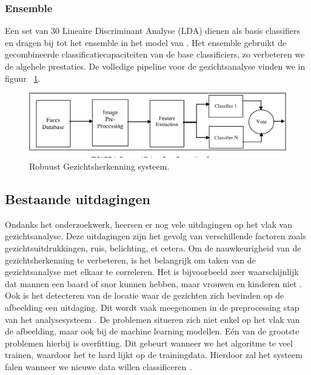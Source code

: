 \subsubsection{Ensemble}
\label{subsub:ensemble}
Een set van 30 Lineaire Discriminant Analyse (LDA) dienen als basis classifiers en dragen bij tot het ensemble in het model van \textcite{Khan2017}. Het ensemble gebruikt de gecombineerde classificatiecapaciteiten van de base classificiers, zo verbeteren we de algehele prestaties. De volledige pipeline voor de gezichtsanalyse vinden we in figuur {~\ref{fig:ensemble}}. 
\begin{figure}
    \centering
    \includegraphics[width=\columnwidth]{graphics/ensemble.png}
    \caption{\label{fig:ensemble}Robuust Gezichtsherkenning systeem\autocite{Khan2017}.}
\end{figure}

\subsection{Bestaande uitdagingen}
Ondanks het onderzoekwerk, heersen er nog vele uitdagingen op het vlak van gezichtsanalyse. Deze uitdagingen zijn het gevolg van verschillende factoren zoals gezichtsuitdrukkingen, ruis, belichting, et cetera. Om de nauwkeurigheid van de gezichtsherkenning te verbeteren, is het belangrijk om taken van de gezichtsanalyse met elkaar te correleren. Het is bijvoorbeeld zeer waarschijnlijk dat mannen een baard of snor kunnen hebben, maar vrouwen en kinderen niet \autocite{Siddiqi2022}. Ook is het detecteren van de locatie waar de gezichten zich bevinden op de afbeelding een uitdaging. Dit wordt vaak meegenomen in de preprocessing stap van het analysesysteem \autocite{Jiang2008}.
De problemen situeren zich niet enkel op het vlak van de afbeelding, maar ook bij de machine learning modellen. Eén van de grootste problemen hierbij is overfitting. Dit gebeurt wanneer we het algoritme te veel trainen, waardoor het te hard lijkt op de trainingdata. Hierdoor zal het systeem falen wanneer we nieuwe data willen classificeren \autocite{Coppens2018}.



